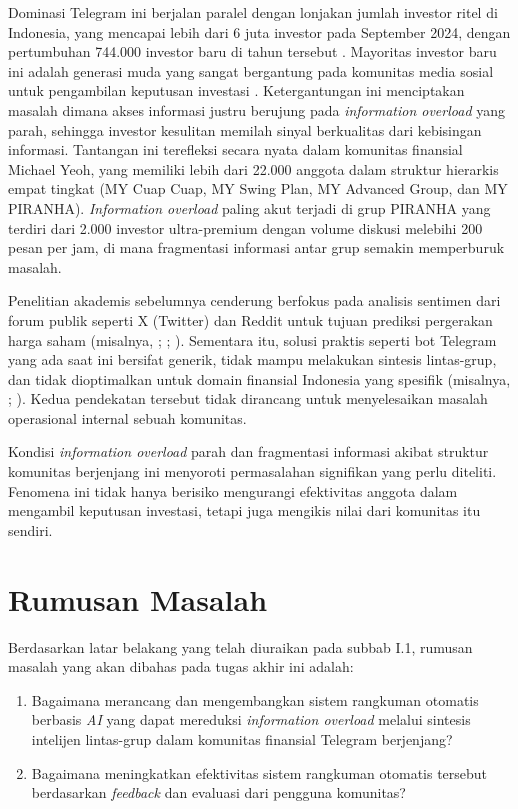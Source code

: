 Dominasi Telegram ini berjalan paralel dengan lonjakan jumlah investor ritel di Indonesia, yang mencapai lebih dari 6 juta investor pada September 2024, dengan pertumbuhan 744.000 investor baru di tahun tersebut \autocite{bei2024}. Mayoritas investor baru ini adalah generasi muda yang sangat bergantung pada komunitas media sosial untuk pengambilan keputusan investasi \autocite{ojk2022,jema2023}. Ketergantungan ini menciptakan masalah dimana akses informasi justru berujung pada \textit{information overload} yang parah, sehingga investor kesulitan memilah sinyal berkualitas dari kebisingan informasi. Tantangan ini terefleksi secara nyata dalam komunitas finansial Michael Yeoh, yang memiliki lebih dari 22.000 anggota dalam struktur hierarkis empat tingkat (MY Cuap Cuap, MY Swing Plan, MY Advanced Group, dan MY PIRANHA). \textit{Information overload} paling akut terjadi di grup PIRANHA yang terdiri dari 2.000 investor ultra-premium dengan volume diskusi melebihi 200 pesan per jam, di mana fragmentasi informasi antar grup semakin memperburuk masalah.

Penelitian akademis sebelumnya cenderung berfokus pada analisis sentimen dari forum publik seperti X (Twitter) dan Reddit untuk tujuan prediksi pergerakan harga saham (misalnya, \textcite{bollen2011}; \textcite{sianipar2023}; \textcite{liew2021}). Sementara itu, solusi praktis seperti bot Telegram yang ada saat ini bersifat generik, tidak mampu melakukan sintesis lintas-grup, dan tidak dioptimalkan untuk domain finansial Indonesia yang spesifik (misalnya, \textcite{stars2023}; \textcite{panda2023}). Kedua pendekatan tersebut tidak dirancang untuk menyelesaikan masalah operasional internal sebuah komunitas.

Kondisi \textit{information overload} parah dan fragmentasi informasi akibat struktur komunitas berjenjang ini menyoroti permasalahan signifikan yang perlu diteliti. Fenomena ini tidak hanya berisiko mengurangi efektivitas anggota dalam mengambil keputusan investasi, tetapi juga mengikis nilai dari komunitas itu sendiri.

\section{Rumusan Masalah}
Berdasarkan latar belakang yang telah diuraikan pada subbab I.1, rumusan masalah yang akan dibahas pada tugas akhir ini adalah:

\begin{enumerate}
\item Bagaimana merancang dan mengembangkan sistem rangkuman otomatis berbasis \textit{AI} yang dapat mereduksi \textit{information overload} melalui sintesis intelijen lintas-grup dalam komunitas finansial Telegram berjenjang?
\item Bagaimana meningkatkan efektivitas sistem rangkuman otomatis tersebut berdasarkan \textit{feedback} dan evaluasi dari pengguna komunitas?
\end{enumerate}

